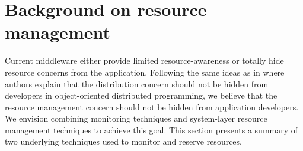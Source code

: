 \section{Background on resource management }

Current middleware either provide limited resource-awareness or totally hide resource concerns from the application.  Following the same ideas as in \cite{guerraoui1999oo} where authors explain that the distribution concern should not be hidden from developers in object-oriented distributed programming, we believe that the resource management concern should not be hidden from application developers. We envision combining monitoring techniques and system-layer resource management techniques to achieve this goal. 
This section presents a summary of two underlying techniques used to monitor and reserve resources. 







